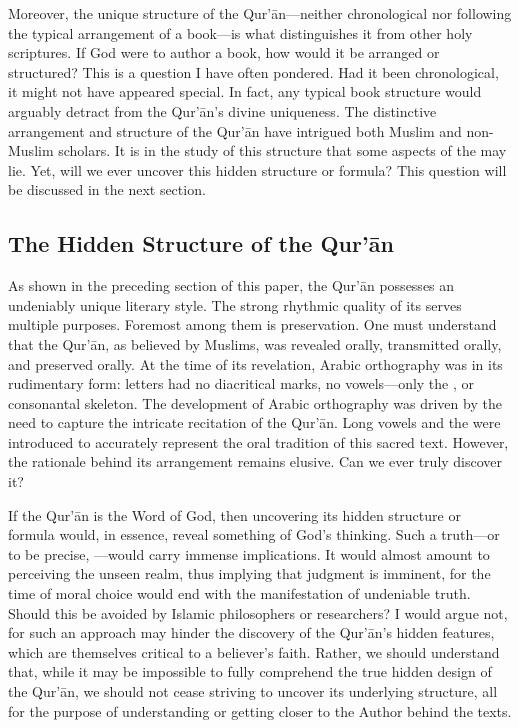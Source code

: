 Moreover, the unique structure of the Qur'\=an—neither chronological nor following the typical arrangement of a book—is what distinguishes it from other holy scriptures. If God were to author a book, how would it be arranged or structured? This is a question I have often pondered. Had it been chronological, it might not have appeared special. In fact, any typical book structure would arguably detract from the Qur'\=an’s divine uniqueness. The distinctive arrangement and structure of the Qur'\=an have intrigued both Muslim and non-Muslim scholars. It is in the study of this structure that some aspects of the   may lie. Yet, will we ever uncover this hidden structure or formula? This question will be discussed in the next section.

\subsection{The Hidden Structure of the Qur'\=an}

As shown in the preceding section of this paper, the Qur'\=an possesses an undeniably unique literary style. The strong rhythmic quality of its   serves multiple purposes. Foremost among them is preservation. One must understand that the Qur'\=an, as believed by Muslims, was revealed orally, transmitted orally, and preserved orally. At the time of its revelation, Arabic orthography was in its rudimentary form: letters had no diacritical marks, no vowels—only the  , or consonantal skeleton. The development of Arabic orthography was driven by the need to capture the intricate recitation of the Qur'\=an. Long vowels and the   were introduced to accurately represent the oral tradition of this sacred text. However, the rationale behind its arrangement remains elusive. Can we ever truly discover it?

If the Qur'\=an is the Word of God, then uncovering its hidden structure or formula would, in essence, reveal something of God's thinking. Such a truth—or to be precise,  —would carry immense implications. It would almost amount to perceiving the unseen realm, thus implying that judgment is imminent, for the time of moral choice would end with the manifestation of undeniable truth. Should this be avoided by Islamic philosophers or researchers? I would argue not, for such an approach may hinder the discovery of the Qur'\=an's hidden features, which are themselves critical to a believer's faith. Rather, we should understand that, while it may be impossible to fully comprehend the true hidden design of the Qur'\=an, we should not cease striving to uncover its underlying structure, all for the purpose of understanding or getting closer to the Author behind the texts.

